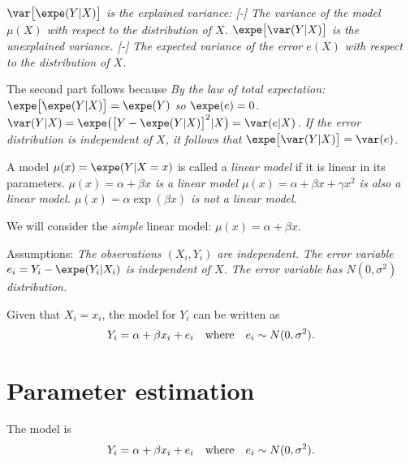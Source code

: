 \bit
\it $\var\big[\expe(Y|X)\big]$ is the \emph{explained} variance: 
	\bit
	\it[-] The variance of the model $\mu(X)$ with respect to the distribution of $X$.
	\eit
\it $\expe\big[\var(Y|X)\big]$ is the \emph{unexplained} variance.
	\bit
	\it[-] The expected variance of the error $e(X)$ with respect to the distribution of $X$.
	\eit
\eit

The second part follows because
\bit
\it By the law of total expectation: $\expe\big[\expe(Y|X)\big] = \expe(Y)$ so $\expe(e)=0$.
\it $\var(Y|X) = \expe\big(\big[Y-\expe(Y|X)\big]^2|X\big) = \var(e|X)$.
\eit
If the error distribution is independent of $X$, it follows that $\expe\big[\var(Y|X)\big] = \var(e)$.




A model $\mu(x)=\expe(Y|X=x)$ is called a \emph{linear model} if it is linear in its parameters.
\bit
\it $\mu(x) = \alpha + \beta x$ is a linear model
\it $\mu(x) = \alpha + \beta x + \gamma x^2$ is also a linear model.
\it $\mu(x) = \alpha\exp(\beta x)$ is not a linear model.
\eit

\vspace*{2ex}
We will consider the \emph{simple} linear model:
\bit
\it $\mu(x) = \alpha + \beta x$.
\eit

\vspace*{2ex}
Assumptions:
\bit
\it The observations $(X_i,Y_i)$ are independent.
\it The error variable $e_i = Y_i-\expe(Y_i|X_i)$ is independent of $X$.
\it The error variable has $N(0,\sigma^2)$ distribution.
\eit

\vspace*{2ex}
Given that $X_i=x_i$, the model for $Y_i$ can be written as
\[
Y_i = \alpha + \beta x_i + e_i \text{\quad where\quad} e_i\sim N(0,\sigma^2).
\]


\section{Parameter estimation}
The model is
\[
Y_i = \alpha + \beta x_i + e_i \text{\quad where\quad} e_i\sim N(0,\sigma^2).
\]

